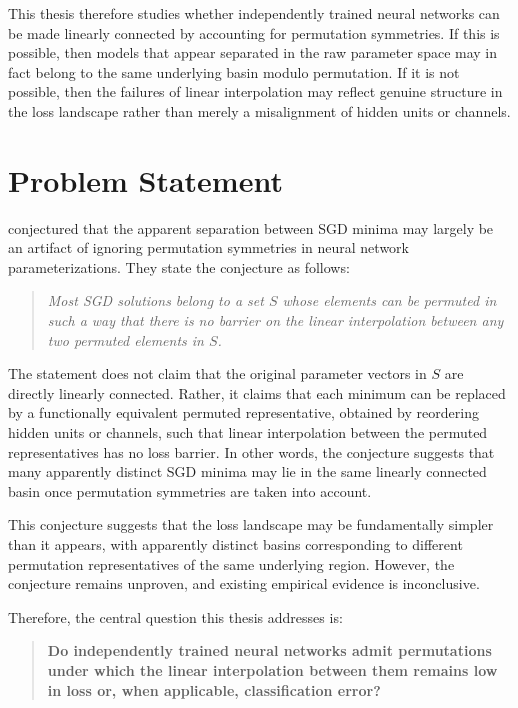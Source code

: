 \documentclass[11pt,a4paper]{report}
\begin{document}
This thesis therefore studies whether independently trained neural networks can be 
made linearly connected by accounting for permutation symmetries. If this is 
possible, then models that appear separated in the raw parameter space may in fact 
belong to the same underlying basin modulo permutation. If it is not possible, then 
the failures of linear interpolation may reflect genuine structure in the loss 
landscape rather than merely a misalignment of hidden units or channels.

\section{Problem Statement}

\citet{entezari2021role} conjectured that the apparent separation between SGD
minima may largely be an artifact of ignoring permutation symmetries in neural
network parameterizations. They state the conjecture as follows:

\begin{quote}
\textit{Most SGD solutions belong to a set $S$ whose elements can be permuted in
such a way that there is no barrier on the linear interpolation between any two
permuted elements in $S$.}
\end{quote}

The statement does not claim that the original parameter vectors in $S$ are directly linearly connected.
Rather, it claims that each minimum can be replaced by a functionally equivalent
permuted representative, obtained by reordering hidden units or channels, such
that linear interpolation between the permuted representatives has no loss
barrier. In other words, the conjecture suggests that many apparently distinct
SGD minima may lie in the same linearly connected basin once permutation
symmetries are taken into account.

This conjecture suggests that the loss landscape may be fundamentally simpler
than it appears, with apparently distinct basins corresponding to different
permutation representatives of the same underlying region. However, the conjecture
remains unproven, and existing empirical evidence is inconclusive.

Therefore, the central question this thesis addresses is:

\begin{quote}
\textbf{Do independently trained neural networks admit permutations under which the linear interpolation between them remains low in loss or, when applicable, classification error?}
\end{quote}
\end{document}
